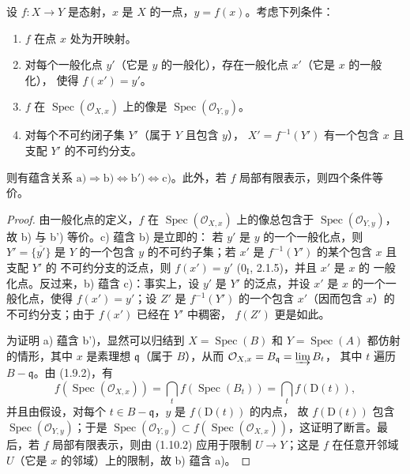 \begin{proposition}[1.10.3]
\label{IV.1.10.3-fr}
设 $f:X\to Y$ 是态射，$x$ 是 $X$ 的一点，$y=f(x)$。考虑下列条件：
\begin{enumerate}
  \item[a)] $f$ 在点 $x$ 处为开映射。
  \item[b)] 对每个一般化点 $y'$（它是 $y$ 的一般化），存在一般化点 $x'$（它是 $x$ 的一般化），
  使得 $f(x')=y'$。
  \item[b')] $f$ 在 $\operatorname{Spec}(\mathcal O_{X,x})$ 上的像是
  $\operatorname{Spec}(\mathcal O_{Y,y})$。
  \item[c)] 对每个不可约闭子集 $Y'$（属于 $Y$ 且包含 $y$），
  $X'=f^{-1}(Y')$ 有一个包含 $x$ 且支配 $Y'$ 的不可约分支。
\end{enumerate}
则有蕴含关系
$\mathrm{a)}\Rightarrow\mathrm{b)}\Leftrightarrow\mathrm{b')}
\Leftrightarrow\mathrm{c)}$。此外，若 $f$ 局部有限表示，则四个条件等价。
\end{proposition}

\begin{proof}
由一般化点的定义，$f$ 在 $\operatorname{Spec}(\mathcal O_{X,x})$ 上的像总包含于
$\operatorname{Spec}(\mathcal O_{Y,y})$，故 b) 与 b') 等价。c) 蕴含 b) 是立即的：
若 $y'$ 是 $y$ 的一个一般化点，则 $Y'=\overline{\{y'\}}$ 是 $Y$ 的一个包含
$y$ 的不可约子集；若 $x'$ 是 $f^{-1}(Y')$ 的某个包含 $x$ 且支配 $Y'$ 的
不可约分支的泛点，则 $f(x')=y'$ ($0_{\mathrm I}$, 2.1.5)，并且 $x'$ 是 $x$ 的
一般化点。反过来，b) 蕴含 c)：事实上，设 $y'$ 是 $Y'$ 的泛点，并设 $x'$
是 $x$ 的一个一般化点，使得 $f(x')=y'$；设 $Z'$ 是 $f^{-1}(Y')$ 的一个包含
$x'$（因而包含 $x$）的不可约分支；由于 $f(x')$ 已经在 $Y'$ 中稠密，
$f(Z')$ 更是如此。

为证明 a) 蕴含 b')，显然可以归结到 $X=\operatorname{Spec}(B)$ 和
$Y=\operatorname{Spec}(A)$ 都仿射的情形，其中 $x$ 是素理想
$\mathfrak q$（属于 $B$），从而
$\mathcal O_{X,x}=B_{\mathfrak q}=\varinjlim B_t$，
其中 $t$ 遍历 $B-\mathfrak q$。由 (1.9.2)，有
\[
  f(\operatorname{Spec}(\mathcal O_{X,x}))
  =\bigcap_t f(\operatorname{Spec}(B_t))=\bigcap_t f(\mathrm D(t)),
\]
并且由假设，对每个 $t\in B-\mathfrak q$，$y$ 是 $f(\mathrm D(t))$ 的内点，
故 $f(\mathrm D(t))$ 包含 $\operatorname{Spec}(\mathcal O_{Y,y})$；于是
$\operatorname{Spec}(\mathcal O_{Y,y})
\subset f(\operatorname{Spec}(\mathcal O_{X,x}))$，这证明了断言。最后，若 $f$
局部有限表示，则由 (1.10.2) 应用于限制 $U\to Y$；这是 $f$ 在任意开邻域
$U$（它是 $x$ 的邻域）上的限制，故 b) 蕴含 a)。
\end{proof}

